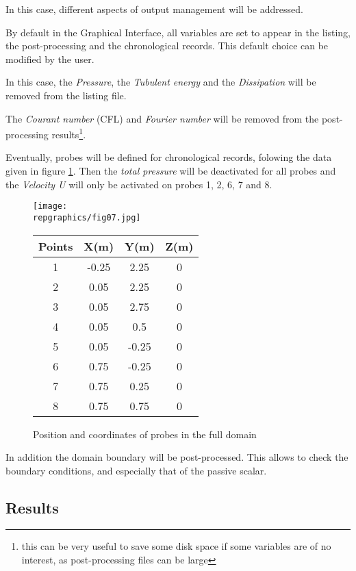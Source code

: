 In this case, different aspects of output management will be addressed.

By default in the Graphical Interface, all variables are set to appear in the
listing, the post-processing and the chronological records. This default choice
can be modified by the user.

In this case, the {\itshape Pressure}, the {\itshape Tubulent energy} and the
{\itshape Dissipation} will be removed from the listing file.

The {\itshape Courant number} (CFL) and {\itshape Fourier number} will be
removed from the
post-processing results\footnote{this can be very useful to save some disk space
if some variables are of no interest, as post-processing files can be large}.

Eventually, probes will be defined for chronological records, folowing the data
given in figure \ref{figante25}. Then the {\itshape total pressure} will be
deactivated for all probes and the {\itshape Velocity U} will only be activated
on probes  1, 2, 6, 7 and 8.

\begin{figure}[htp]
\parbox{8cm}{%
\centerline{\texttt{[image: \\repgraphics/fig07.jpg]}}}
\parbox{7cm}{%
\begin{center}
\begin{tabular}{|c|c|c|c|}
\hline
Points & X(m) & Y(m) & Z(m)\\
\hline
1 & -0.25 & 2.25 & 0 \\
\hline
2 & 0.05 & 2.25 & 0 \\
\hline
3 & 0.05 & 2.75 & 0 \\
\hline
4 & 0.05 & 0.5 & 0 \\
\hline
5 & 0.05 & -0.25 & 0 \\
\hline
6 & 0.75 & -0.25 & 0 \\
\hline
7 & 0.75 & 0.25 & 0 \\
\hline
8 & 0.75 & 0.75 & 0 \\
\hline
\end{tabular}
\end{center}
}
\caption{Position and coordinates of probes in the full domain}
\label{figante25}
\end{figure}

In addition the domain boundary will be post-processed. This allows to check the
boundary conditions, and especially that of the passive scalar.


        \subsection{Results}

